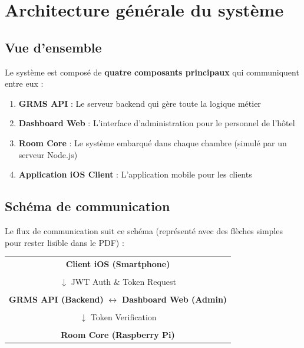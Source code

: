 \documentclass[11pt,a4paper]{article}
\begin{document}
\section{Architecture générale du système}

\subsection{Vue d'ensemble}

Le système est composé de \textbf{quatre composants principaux} qui communiquent entre eux :

\begin{enumerate}
    \item \textbf{GRMS API} : Le serveur backend qui gère toute la logique métier
    \item \textbf{Dashboard Web} : L'interface d'administration pour le personnel de l'hôtel
    \item \textbf{Room Core} : Le système embarqué dans chaque chambre (simulé par un serveur Node.js)
    \item \textbf{Application iOS Client} : L'application mobile pour les clients
\end{enumerate}

\subsection{Schéma de communication}

Le flux de communication suit ce schéma (représenté avec des flèches simples pour rester lisible dans le PDF) :

\begin{center}
\begin{tabular}{c}
\textbf{Client iOS (Smartphone)} \\
\\
$\downarrow$ \small JWT Auth \& Token Request \\
\\
\textbf{GRMS API (Backend)} \hspace{1cm} $\leftrightarrow$ \hspace{1cm} \textbf{Dashboard Web (Admin)} \\
\\
$\downarrow$ \small Token Verification \\
\\
\textbf{Room Core (Raspberry Pi)} \\
\end{tabular}
\end{center}
\end{document}
